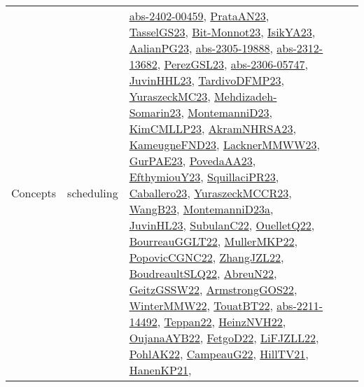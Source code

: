 {\begin{longtable}{lp{3cm}>{\raggedright}p{6cm}>{\raggedright}p{6cm}p{8cm}}
Concepts & scheduling & \href{articles/abs-2402-00459.pdf}{abs-2402-00459}\cite{abs-2402-00459}, \href{articles/PrataAN23.pdf}{PrataAN23}\cite{PrataAN23}, \href{papers/TasselGS23.pdf}{TasselGS23}\cite{TasselGS23}, \href{papers/Bit-Monnot23.pdf}{Bit-Monnot23}\cite{Bit-Monnot23}, \href{articles/IsikYA23.pdf}{IsikYA23}\cite{IsikYA23}, \href{papers/AalianPG23.pdf}{AalianPG23}\cite{AalianPG23}, \href{articles/abs-2305-19888.pdf}{abs-2305-19888}\cite{abs-2305-19888}, \href{articles/abs-2312-13682.pdf}{abs-2312-13682}\cite{abs-2312-13682}, \href{papers/PerezGSL23.pdf}{PerezGSL23}\cite{PerezGSL23}, \href{articles/abs-2306-05747.pdf}{abs-2306-05747}\cite{abs-2306-05747}, \href{papers/JuvinHHL23.pdf}{JuvinHHL23}\cite{JuvinHHL23}, \href{papers/TardivoDFMP23.pdf}{TardivoDFMP23}\cite{TardivoDFMP23}, \href{papers/YuraszeckMC23.pdf}{YuraszeckMC23}\cite{YuraszeckMC23}, \href{papers/Mehdizadeh-Somarin23.pdf}{Mehdizadeh-Somarin23}\cite{Mehdizadeh-Somarin23}, \href{articles/MontemanniD23.pdf}{MontemanniD23}\cite{MontemanniD23}, \href{papers/KimCMLLP23.pdf}{KimCMLLP23}\cite{KimCMLLP23}, \href{articles/AkramNHRSA23.pdf}{AkramNHRSA23}\cite{AkramNHRSA23}, \href{papers/KameugneFND23.pdf}{KameugneFND23}\cite{KameugneFND23}, \href{articles/LacknerMMWW23.pdf}{LacknerMMWW23}\cite{LacknerMMWW23}, \href{articles/GurPAE23.pdf}{GurPAE23}\cite{GurPAE23}, \href{papers/PovedaAA23.pdf}{PovedaAA23}\cite{PovedaAA23}, \href{papers/EfthymiouY23.pdf}{EfthymiouY23}\cite{EfthymiouY23}, \href{papers/SquillaciPR23.pdf}{SquillaciPR23}\cite{SquillaciPR23}, \href{articles/Caballero23.pdf}{Caballero23}\cite{Caballero23}, \href{articles/YuraszeckMCCR23.pdf}{YuraszeckMCCR23}\cite{YuraszeckMCCR23}, \href{papers/WangB23.pdf}{WangB23}\cite{WangB23}, \href{articles/MontemanniD23a.pdf}{MontemanniD23a}\cite{MontemanniD23a}, \href{papers/JuvinHL23.pdf}{JuvinHL23}\cite{JuvinHL23}, \href{articles/SubulanC22.pdf}{SubulanC22}\cite{SubulanC22}, \href{papers/OuelletQ22.pdf}{OuelletQ22}\cite{OuelletQ22}, \href{articles/BourreauGGLT22.pdf}{BourreauGGLT22}\cite{BourreauGGLT22}, \href{articles/MullerMKP22.pdf}{MullerMKP22}\cite{MullerMKP22}, \href{papers/PopovicCGNC22.pdf}{PopovicCGNC22}\cite{PopovicCGNC22}, \href{papers/ZhangJZL22.pdf}{ZhangJZL22}\cite{ZhangJZL22}, \href{papers/BoudreaultSLQ22.pdf}{BoudreaultSLQ22}\cite{BoudreaultSLQ22}, \href{articles/AbreuN22.pdf}{AbreuN22}\cite{AbreuN22}, \href{papers/GeitzGSSW22.pdf}{GeitzGSSW22}\cite{GeitzGSSW22}, \href{papers/ArmstrongGOS22.pdf}{ArmstrongGOS22}\cite{ArmstrongGOS22}, \href{papers/WinterMMW22.pdf}{WinterMMW22}\cite{WinterMMW22}, \href{papers/TouatBT22.pdf}{TouatBT22}\cite{TouatBT22}, \href{articles/abs-2211-14492.pdf}{abs-2211-14492}\cite{abs-2211-14492}, \href{papers/Teppan22.pdf}{Teppan22}\cite{Teppan22}, \href{articles/HeinzNVH22.pdf}{HeinzNVH22}\cite{HeinzNVH22}, \href{papers/OujanaAYB22.pdf}{OujanaAYB22}\cite{OujanaAYB22}, \href{articles/FetgoD22.pdf}{FetgoD22}\cite{FetgoD22}, \href{papers/LiFJZLL22.pdf}{LiFJZLL22}\cite{LiFJZLL22}, \href{articles/PohlAK22.pdf}{PohlAK22}\cite{PohlAK22}, \href{articles/CampeauG22.pdf}{CampeauG22}\cite{CampeauG22}, \href{papers/HillTV21.pdf}{HillTV21}\cite{HillTV21}, \href{papers/HanenKP21.pdf}{HanenKP21}\cite{HanenKP21}, 
\end{longtable}}
